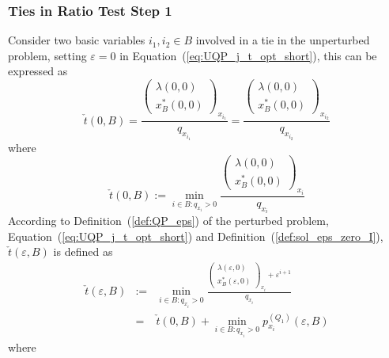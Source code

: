 \documentclass[a4paper]{article}
\newcommand{\px}[3]{\ensuremath{p_{x_{#1}}^{(#2)}(\varepsilon, #3)}}
\begin{document}
 
\subsubsection{Ties in Ratio Test Step 1}
\label{sec:Ties_ratio_test_step_1}
Consider two basic variables $i_{1}, i_{2} \in B$ involved in a tie in the
unperturbed problem, setting $\varepsilon=0$ in
Equation~(\ref{eq:UQP_j_t_opt_short}), this can be expressed as
\begin{equation}
\check{t}\left(0, B\right)=
\frac{\left(\begin{array}{c}
              \lambda\left(0, 0 \right) \\
              \hline
               x_{B}^{*}\left(0, 0\right)
            \end{array}
      \right)_{x_{i_{1}}}}{q_{x_{i_{1}}}}
=
\frac{\left(\begin{array}{c}
              \lambda\left(0, 0 \right) \\
              \hline
              x_{B}^{*}\left(0, 0\right) 
            \end{array}
       \right)_{x_{i_{2}}}}{q_{x_{i_{2}}}}
\end{equation}
where
\begin{equation}
\check{t}\left(0, B\right):=\min_{i \in B: q_{x_{i}} > 0}
\frac{\left(\begin{array}{c}
               \lambda\left(0, 0\right) \\
               \hline
               x_{B}^{*}\left(0, 0\right)
            \end{array}
       \right)_{x_{i}}}{q_{x_{i}}}
\end{equation}
According to Definition~(\ref{def:QP_eps}) of the perturbed problem,
Equation~(\ref{eq:UQP_j_t_opt_short}) and
Definition~(\ref{def:sol_eps_zero_I}),
$\check{t}(\varepsilon, B)$
is defined as
\begin{eqnarray}
\label{def:t_min_eps}
\check{t}\left(\varepsilon, B\right) & := &
  \min_{i \in B: q_{x_{i}} > 0}
  \frac{\left(\begin{array}{c}
                \lambda\left(\varepsilon, 0 \right) \\
	        \hline
	        x_{B}^{*}\left(\varepsilon, 0 \right)
	      \end{array}
        \right)_{x_{i}}+ \varepsilon^{i+1}}{q_{x_{i}}} \\
  &=&
    \check{t}\left(0, B \right) +
  \min_{i \in B: q_{x_{i}} > 0} \px{i}{Q_{1}}{B}
\end{eqnarray}
where
\end{document}
